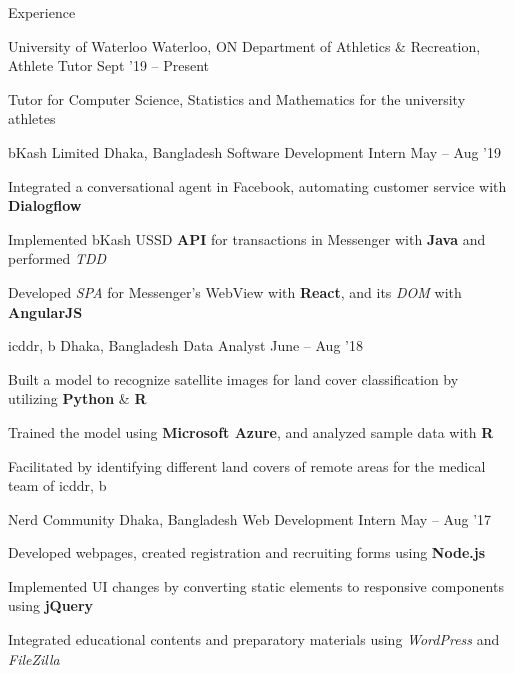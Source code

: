 \documentclass{resume} %
\begin{document}
\begin{rSection}{Experience}
  \begin{rWorkSection}{University of Waterloo}
                           {Waterloo, ON}
                           {Department of Athletics \& Recreation, Athlete Tutor}
                           {Sept '19 -- Present}
                           {
    \item Tutor for Computer Science, Statistics and Mathematics for the university athletes
  }
  \end{rWorkSection}

  \begin{rWorkSection}{bKash Limited}
                      {Dhaka, Bangladesh}
                      {Software Development Intern}
                      {May -- Aug '19}
  {
    \item Integrated a conversational agent in Facebook, automating customer service with {\bf Dialogflow}
    \item Implemented bKash USSD {\bf API} for transactions in Messenger with {\bf Java} and performed \textit{TDD}
    \item Developed \textit{SPA} for Messenger’s WebView with {\bf React}, and its \textit{DOM} with {\bf AngularJS}

  }
  \end{rWorkSection}

  \begin{rWorkSection}{icddr, b}
                     {Dhaka, Bangladesh}
                     {Data Analyst }
                     {June -- Aug '18}
  {
    \item Built a model to recognize satellite images for land cover classification by utilizing {\bf Python} \& {\bf R}
    \item Trained the model using {\bf Microsoft Azure}, and analyzed sample data with {\bf R}
    \item Facilitated by identifying different land covers of remote areas for the medical team of icddr, b
  }
  \end{rWorkSection}

  \begin{rWorkSection}{Nerd Community}
                     {Dhaka, Bangladesh}
                     {Web Development Intern}
                     {May -- Aug '17}
  {
    \item Developed webpages, created registration and recruiting forms using {\bf Node.js}
    \item Implemented UI changes by converting static elements to responsive components using {\bf jQuery}
    \item Integrated educational contents and preparatory materials using \textit{WordPress} and \textit{FileZilla}
  }
  \end{rWorkSection}
  
\end{rSection}
\end{document}
